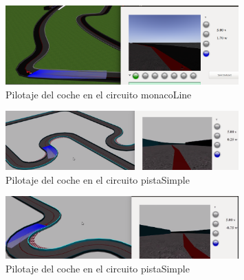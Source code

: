 \begin{figure}[H]
\begin{center}
	\includegraphics[width=0.8\textwidth]{figures/Clasificacion/monaco_class.png}
   \caption{Pilotaje del coche en el circuito monacoLine}
	\label{fig.monaco_class}
\end{center}
\end{figure}


\begin{figure}[H]
\begin{center}
	\includegraphics[width=0.8\textwidth]{figures/Clasificacion/frame1.png}
   \caption{Pilotaje del coche en el circuito pistaSimple}
	\label{fig.simple_frame1}
\end{center}
\end{figure}

\begin{figure}[H]
\begin{center}
	\includegraphics[width=0.8\textwidth]{figures/Clasificacion/frame2.png}
   \caption{Pilotaje del coche en el circuito pistaSimple}
	\label{fig.simple_frame2}
\end{center}
\end{figure}